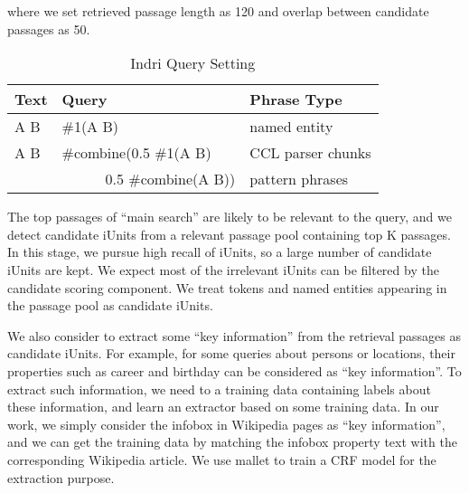 \noindent where we set retrieved passage length as 120 and overlap between candidate passages as 50.

\begin{table}
\caption{Indri Query Setting}
\label{table:query}

\centering
\begin{tabular}{|l|l|l|}
\hline
\bf{Text} & \bf{Query} & \bf{Phrase Type} \\
\hline
\hline
A B & \#1(A B) & named entity \\
\hline
A B & \#combine(0.5 \#1(A B)  & CCL parser chunks \\
    & \ \ \ \ \ \ 0.5 \#combine(A B))     & pattern phrases \\
\hline

\end{tabular}

\end{table}



The top passages of ``main search''  are likely to be relevant to the query, and we detect candidate iUnits from a relevant passage pool containing top K passages.
In this stage, we pursue high recall of iUnits, so a large number of candidate iUnits are kept.
We expect most of the irrelevant iUnits can be filtered by the candidate scoring component.
We treat tokens and named entities appearing in the passage pool as candidate iUnits.


We also consider to extract some ``key information'' from the retrieval passages as candidate iUnits.
For example, for some queries about persons or locations, their properties such as career and birthday can be considered as ``key information''.
To extract such information, we need to a training data containing labels about these information, and learn an extractor based on some training data.
In our work, we simply consider the infobox in Wikipedia pages as ``key information'', and we can get the training data by matching the infobox property text with the corresponding Wikipedia article.
We use mallet \cite{mccallum_02} to train a CRF model \cite{Lafferty_etal_ICML01} for the extraction purpose.

